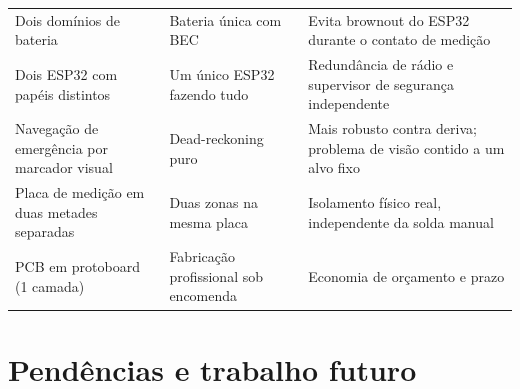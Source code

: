 \documentclass[11pt,a4paper]{article}
\begin{document}
\begin{longtable}{@{}p{4.4cm}p{4.4cm}p{5.4cm}@{}}
Dois domínios de bateria & Bateria única com BEC & Evita brownout do ESP32 durante o contato de medição \\
Dois ESP32 com papéis distintos & Um único ESP32 fazendo tudo & Redundância de rádio e supervisor de segurança independente \\
Navegação de emergência por marcador visual & Dead-reckoning puro & Mais robusto contra deriva; problema de visão contido a um alvo fixo \\
Placa de medição em duas metades separadas & Duas zonas na mesma placa & Isolamento físico real, independente da solda manual \\
PCB em protoboard (1 camada) & Fabricação profissional sob encomenda & Economia de orçamento e prazo \\
\end{longtable}

\section{Pendências e trabalho futuro}
\end{document}
